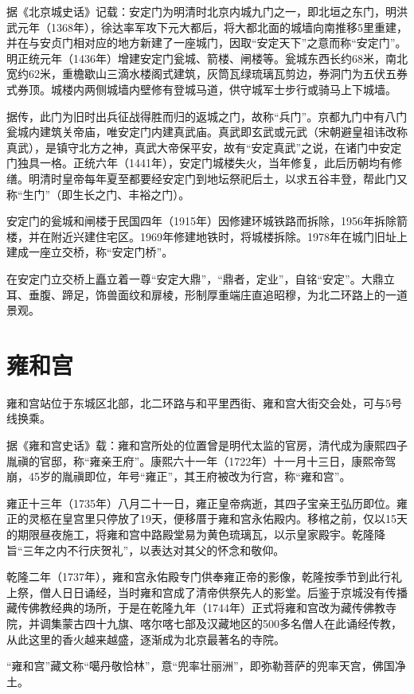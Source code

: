 据《北京城史话》记载：安定门为明清时北京内城九门之一，即北垣之东门，明洪武元年（1368年），徐达率军攻下元大都后，将大都北面的城墙向南推移5里重建，并在与安贞门相对应的地方新建了一座城门，因取“安定天下”之意而称“安定门”。明正统元年（1436年）增建安定门瓮城、箭楼、闸楼等。瓮城东西长约68米，南北宽约62米，重檐歇山三滴水楼阁式建筑，灰筒瓦绿琉璃瓦剪边，券洞门为五伏五券式券顶。城楼内两侧城墙内壁修有登城马道，供守城军士步行或骑马上下城墙。

据传，此门为旧时出兵征战得胜而归的返城之门，故称“兵门”。京都九门中有八门瓮城内建筑关帝庙，唯安定门内建真武庙。真武即玄武或元武（宋朝避皇祖讳改称真武），是镇守北方之神，真武大帝保平安，故有“安定真武”之说，在诸门中安定门独具一格。正统六年（1441年），安定门城楼失火，当年修复，此后历朝均有修缮。明清时皇帝每年夏至都要经安定门到地坛祭祀后土，以求五谷丰登，帮此门又称“生门”（即生长之门、丰裕之门）。

安定门的瓮城和闸楼于民国四年（1915年）因修建环城铁路而拆除，1956年拆除箭楼，并在附近兴建住宅区。1969年修建地铁时，将城楼拆除。1978年在城门旧址上建成一座立交桥，称“安定门桥”。

在安定门立交桥上矗立着一尊“安定大鼎”，“鼎者，定业”，自铭“安定”。大鼎立耳、垂腹、蹄足，饰兽面纹和扉棱，形制厚重端庄直追昭穆，为北二环路上的一道景观。

\section{雍和宫}
雍和宫站位于东城区北部，北二环路与和平里西街、雍和宫大街交会处，可与5号线换乘。

据《雍和宫史话》载：雍和宫所处的位置曾是明代太监的官房，清代成为康熙四子胤禛的官邸，称“雍亲王府”。康熙六十一年（1722年）十一月十三日，康熙帝驾崩，45岁的胤禛即位，年号“雍正”，其王府被改为行宫，称“雍和宫”。

雍正十三年（1735年）八月二十一日，雍正皇帝病逝，其四子宝亲王弘历即位。雍正的灵柩在皇宫里只停放了19天，便移厝于雍和宫永佑殿内。移棺之前，仅以15天的期限昼夜施工，将雍和宫中路殿堂易为黄色琉璃瓦，以示皇家殿宇。乾隆降旨“三年之内不行庆贺礼”，以表达对其父的怀念和敬仰。

乾隆二年（1737年），雍和宫永佑殿专门供奉雍正帝的影像，乾隆按季节到此行礼上祭，僧人日日诵经，当时雍和宫成了清帝供祭先人的影堂。后鉴于京城没有传播藏传佛教经典的场所，于是在乾隆九年（1744年）正式将雍和宫改为藏传佛教寺院，并调集蒙古四十九旗、喀尔喀七部及汉藏地区的500多名僧人在此诵经传教，从此这里的香火越来越盛，逐渐成为北京最著名的寺院。

“雍和宫”藏文称“噶丹敬恰林”，意“兜率壮丽洲”，即弥勒菩萨的兜率天宫，佛国净土。

